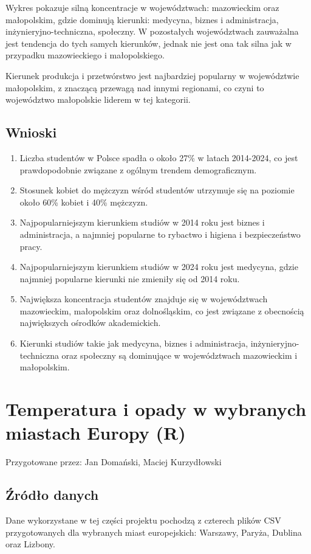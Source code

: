\documentclass[12pt]{article}
\begin{document}
Wykres pokazuje silną koncentracje w województwach: mazowieckim oraz małopolskim, gdzie dominują kierunki: medycyna, biznes i administracja, inżynieryjno-techniczna, społeczny.
W pozostałych województwach zauważalna jest tendencja do tych samych kierunków, jednak nie jest ona tak silna jak w przypadku mazowieckiego i małopolskiego.

Kierunek produkcja i przetwórstwo jest najbardziej popularny w województwie małopolskim, z znaczącą przewagą nad innymi regionami, co czyni to województwo małopolskie liderem w tej kategorii.

\subsection{Wnioski}
\begin{enumerate}
    \item Liczba studentów w Polsce spadła o około 27\% w latach 2014-2024, co jest prawdopodobnie związane z ogólnym trendem demograficznym.
    \item Stosunek kobiet do mężczyzn wśród studentów utrzymuje się na poziomie około 60\% kobiet i 40\% mężczyzn.
    \item Najpopularniejszym kierunkiem studiów w 2014 roku jest biznes i administracja, a najmniej popularne to rybactwo i higiena i bezpieczeństwo pracy.
    \item Najpopularniejszym kierunkiem studiów w 2024 roku jest medycyna, gdzie najmniej popularne kierunki nie zmieniły się od 2014 roku.
    \item Największa koncentracja studentów znajduje się w województwach mazowieckim, małopolskim oraz dolnośląskim, co jest związane z obecnością największych ośrodków akademickich.
    \item Kierunki studiów takie jak medycyna, biznes i administracja, inżynieryjno-techniczna oraz społeczny są dominujące w województwach mazowieckim i małopolskim.
\end{enumerate}

\newpage

\section{Temperatura i opady w wybranych miastach Europy (R)}

Przygotowane przez: Jan Domański, Maciej Kurzydłowski

\subsection{Źródło danych}
Dane wykorzystane w tej części projektu pochodzą z czterech plików CSV przygotowanych dla wybranych miast europejskich: Warszawy, Paryża, Dublina oraz Lizbony.
\end{document}
